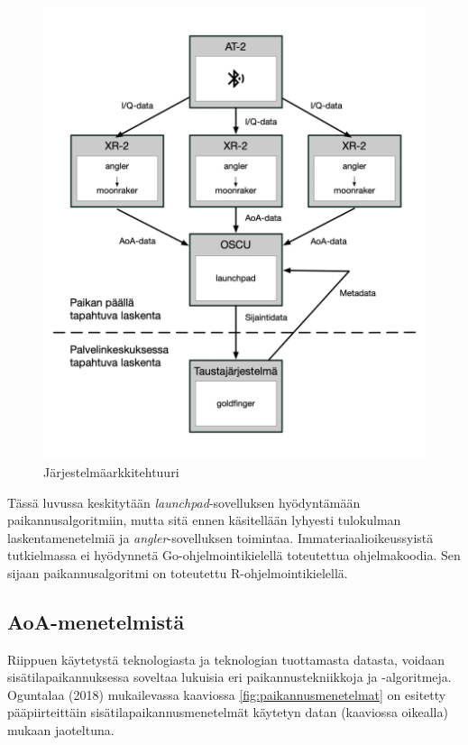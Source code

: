 \documentclass[
  12pt,
  a4paper, twoside]{book}
\begin{document}
\begin{figure}[H]
\centering
\includegraphics[width=15cm]{jarjestelmaarkkitehtuuri}
\caption{Järjestelmäarkkitehtuuri}
\label{fig:jarjestelmaarkkitehtuuri}
\end{figure}

Tässä luvussa keskitytään \emph{launchpad}-sovelluksen hyödyntämään paikannusalgoritmiin, mutta sitä ennen käsitellään lyhyesti tulokulman laskentamenetelmiä ja \emph{angler}-sovelluksen toimintaa. Immateriaalioikeussyistä tutkielmassa ei hyödynnetä Go-ohjelmointikielellä toteutettua ohjelmakoodia. Sen sijaan paikannusalgoritmi on toteutettu R-ohjelmointikielellä.

\subsection{AoA-menetelmistä} \label{aoa}

Riippuen käytetystä teknologiasta ja teknologian tuottamasta datasta, voidaan sisätilapaikannuksessa soveltaa lukuisia eri paikannustekniikkoja ja -algoritmeja. Oguntalaa (2018) \citep{oguntala-2018} mukailevassa kaaviossa \ref{fig:paikannusmenetelmat} on esitetty pääpiirteittäin sisätilapaikannusmenetelmät käytetyn datan (kaaviossa oikealla) mukaan jaoteltuna.
\end{document}
